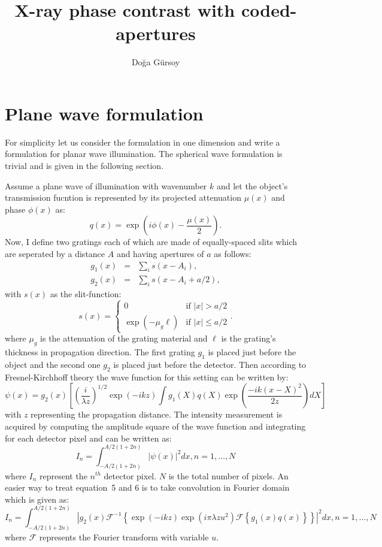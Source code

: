 \documentclass[letterpaper,12pt]{amsart} %
\title{X-ray phase contrast with coded-apertures}
\author{Do\u{g}a G\"ursoy}
\begin{document}
\maketitle

\section{Plane wave formulation}
For simplicity let us consider the formulation in one dimension and write a formulation for planar wave illumination. The spherical wave formulation is trivial and is given in the following section. 

Assume a plane wave of illumination with wavenumber $k$ and let the object's transmission fucntion is represented by its projected attenuation $\mu(x)$ and phase $\phi(x)$ as:
\begin{equation}
 q(x) = \exp\left(i\phi(x)-\frac{\mu(x)}{2}\right).
\end{equation}
Now, I define two gratings each of which are made of equally-spaced slits which are seperated by a distance $A$ and having apertures of $a$ as follows:
\begin{eqnarray}
 g_1(x) &=& \sum_is(x-A_i), \\
 g_2(x) &=& \sum_is(x-A_i+a/2),
\end{eqnarray}
with $s(x)$ as the slit-function:
\begin{equation}
 s(x) = \left\lbrace \begin{array}{ll}
        0 & \mbox{if $|x| > a/2$}\\
        \exp(-\mu_g\ell) & \mbox{if $|x| \leq a/2$}\end{array}\right..
\end{equation}
where $\mu_g$ is the attenuation of the grating material and $\ell$ is the grating's thickness in propagation direction. The first grating $g_1$ is placed just before the object and the second one $g_2$ is placed just before the detector. Then according to Fresnel-Kirchhoff theory the wave function for this setting can be written by:
\begin{equation}
  \psi(x) = g_2(x)\left[\left(\frac{i}{\lambda z}\right)^{1/2}\exp\left(-ikz\right)\int g_1(X)q(X)\exp\left(\frac{-ik(x-X)^2}{2z}\right)dX\right] 
\end{equation}
with $z$ representing the propagation distance. The intensity measurement is acquired by computing the amplitude square of the wave function and integrating for each detector pixel and can be written as:
\begin{equation}
 I_n = \int_{-A/2(1+2n)}^{A/2(1+2n)} |\psi(x)|^2 dx, n=1,\dots,N
\end{equation}
where $I_n$ represent the $n^{th}$ detector pixel. $N$ is the total number of pixels. An easier way to treat equation~5 and 6 is to take convolution in Fourier domain which is given as:
\begin{equation}
  I_n = \int_{-A/2(1+2n)}^{A/2(1+2n)}|g_2(x)\mathcal{F}^{-1}\left\lbrace\exp\left(-ikz\right)\exp\left(i\pi\lambda z u^2\right)\mathcal{F}\left\lbrace g_1(x) q(x)\right\rbrace\right\rbrace |^2dx, n=1,\dots,N
\end{equation}
where $\mathcal{F}$ represents the Fourier transform with variable $u$.
\end{document}
